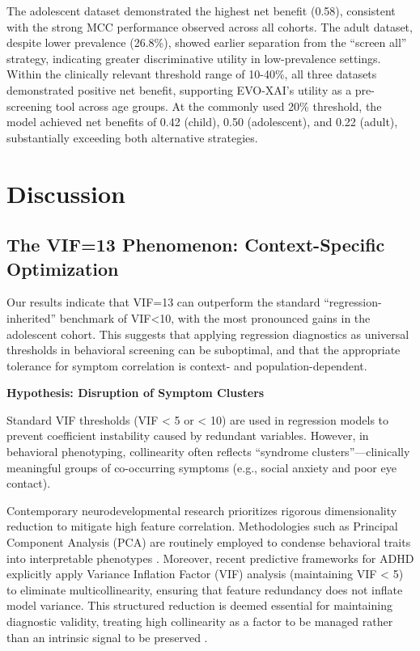 \documentclass[pdflatex,sn-vancouver-num]{sn-jnl}
\begin{document}
The adolescent dataset demonstrated the highest net benefit (0.58), consistent with the strong MCC performance observed across all cohorts. The adult dataset, despite lower prevalence (26.8\%), showed earlier separation from the ``screen all'' strategy, indicating greater discriminative utility in low-prevalence settings. Within the clinically relevant threshold range of 10-40\%, all three datasets demonstrated positive net benefit, supporting EVO-XAI's utility as a pre-screening tool across age groups. At the commonly used 20\% threshold, the model achieved net benefits of 0.42 (child), 0.50 (adolescent), and 0.22 (adult), substantially exceeding both alternative strategies.

\FloatBarrier

\section{Discussion}\label{discussion}

\subsection{The VIF=13 Phenomenon: Context-Specific Optimization}\label{the-vif13-phenomenon-context-specific-optimization}

Our results indicate that VIF=13 can outperform the standard ``regression-inherited'' benchmark of VIF\textless10, with the most pronounced gains in the adolescent cohort. This suggests that applying regression diagnostics as universal thresholds in behavioral screening can be suboptimal, and that the appropriate tolerance for symptom correlation is context- and population-dependent.

\textbf{Hypothesis: Disruption of Symptom Clusters}

Standard VIF thresholds (VIF \textless{} 5 or \textless{} 10) are used in regression models to prevent coefficient instability caused by redundant variables. However, in behavioral phenotyping, collinearity often reflects ``syndrome clusters''---clinically meaningful groups of co-occurring symptoms (e.g., social anxiety and poor eye contact).

Contemporary neurodevelopmental research prioritizes rigorous dimensionality reduction to mitigate high feature correlation. Methodologies such as Principal Component Analysis (PCA) are routinely employed to condense behavioral traits into interpretable phenotypes \cite{ref62,ref63}. Moreover, recent predictive frameworks for ADHD explicitly apply Variance Inflation Factor (VIF) analysis (maintaining VIF \textless{} 5) to eliminate multicollinearity, ensuring that feature redundancy does not inflate model variance\cite{ref64}. This structured reduction is deemed essential for maintaining diagnostic validity, treating high collinearity as a factor to be managed rather than an intrinsic signal to be preserved \cite{ref65}.
\end{document}
